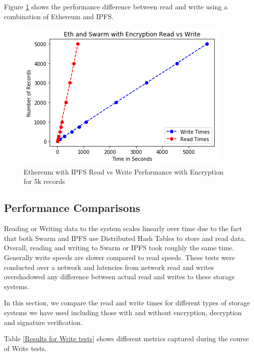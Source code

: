 \documentclass[11pt,openright]{report}
\begin{document}
Figure \ref{fig:graph_eth_ipfs_readvwrite_wencr} shows the performance difference between read and write using a combination of Ethereum and IPFS.

\begin{figure}
	\centering
	\includegraphics[scale=1]{results/Eth_IPFS_read_vs_write_wencr.png}
	\caption{Ethereum with IPFS Read vs Write Performance with Encryption for 5k records}
	\label{fig:graph_eth_ipfs_readvwrite_wencr}
\end{figure}
\newpage

\subsection{Performance Comparisons}
Reading or Writing data to the system scales linearly over time due to the fact that both Swarm and IPFS use Distributed Hash Tables to store and read data. Overall, reading and writing to Swarm or IPFS took roughly the same time. Generally write speeds are slower compared to read speeds. These tests were conducted over a network and latencies from network read and writes overshadowed any difference between actual read and writes to these storage systems.

In this section, we compare the read and write times for different types of storage systems we have used including those with and without encryption, decryption and signature verification.

Table \ref{Results for Write tests} shows different metrics captured during the course of Write tests.
\end{document}
